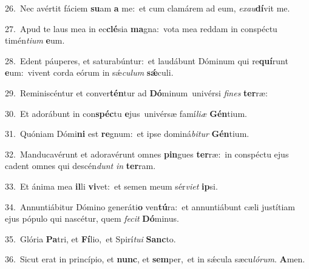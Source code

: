 {\numbfont\textcolor{\numbcolor}{26.}}~Nec avértit fáciem \textbf{su}\-am \textbf{a} me:~\star et cum clamárem ad eum, \textit{ex}\-\textit{au}\textbf{dí}vit me.\par
{\numbfont\textcolor{\numbcolor}{27.}}~Apud te laus mea in ec\-\textbf{clé}\-sia \textbf{ma}\-gna:~\star vota mea reddam in conspéctu timén\-\textit{ti}\-\textit{um} \textbf{e}\-um.\par
{\numbfont\textcolor{\numbcolor}{28.}}~Edent páuperes, et saturabúntur:~\dagger et laudábunt Dóminum qui re\-\textbf{quí}\-runt \textbf{e}\-um:~\star vivent corda eórum in sǽ\-\textit{cu}\-\textit{lum} \textbf{sǽ}\-culi.\par
{\numbfont\textcolor{\numbcolor}{29.}}~Reminiscéntur et conver\-\textbf{tén}\-tur ad \textbf{Dó}\-minum~\star univérsi \textit{fi}\-\textit{nes} \textbf{ter}\-ræ:\par
{\numbfont\textcolor{\numbcolor}{30.}}~Et adorábunt in con\-\textbf{spéc}\-tu \textbf{e}\-jus~\star univérsæ famí\-\textit{li}\-\textit{æ} \textbf{Gén}\-tium.\par
{\numbfont\textcolor{\numbcolor}{31.}}~Quóniam Dómi\textbf{ni} est \textbf{re}\-gnum:~\star et ipse dominá\-\textit{bi}\-\textit{tur} \textbf{Gén}\-tium.\par
{\numbfont\textcolor{\numbcolor}{32.}}~Manducavérunt et adoravérunt omnes \textbf{pin}\-gues \textbf{ter}\-ræ:~\star in conspéctu ejus cadent omnes qui descén\textit{dunt} \textit{in} \textbf{ter}\-ram.\par
{\numbfont\textcolor{\numbcolor}{33.}}~Et ánima mea \textbf{il}\-li \textbf{vi}\-vet:~\star et semen meum sér\-\textit{vi}\-\textit{et} \textbf{ip}\-si.\par
{\numbfont\textcolor{\numbcolor}{34.}}~Annuntiábitur Dómino generáti\textbf{o} ven\-\textbf{tú}\-ra:~\star et annuntiábunt cæli justítiam ejus pópulo qui nascétur, quem \textit{fe}\-\textit{cit} \textbf{Dó}\-minus.\par
{\numbfont\textcolor{\numbcolor}{35.}}~Glória \textbf{Pa}\-tri, et \textbf{Fí}\-lio,~\star et Spirí\-\textit{tu}\-\textit{i} \textbf{Sanc}\-to.\par
{\numbfont\textcolor{\numbcolor}{36.}}~Sicut erat in princípio, et \textbf{nunc}\-, et \textbf{sem}\-per,~\star et in sǽcula sæcu\-\textit{ló}\-\textit{rum}. \textbf{A}\-men.\par
